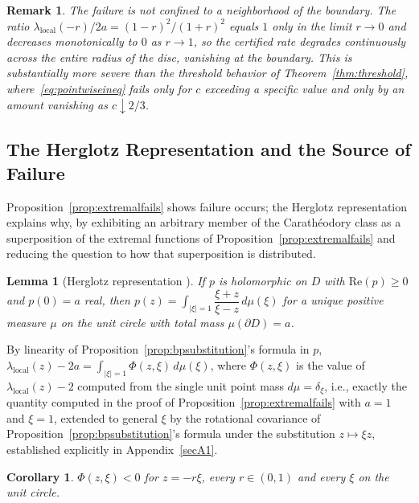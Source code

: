 \documentclass[pdflatex,sn-mathphys-num]{sn-jnl}%
\theoremstyle{thmstyleone}%
\theoremstyle{thmstyletwo}%
\newtheorem{remark}{Remark}%
\theoremstyle{thmstylethree}%
\newtheorem{lemma}{Lemma} %
\newtheorem{corollary}{Corollary}
\begin{document}
\begin{remark}
\label{rem:severityoffail}
The failure is not confined to a neighborhood of the boundary. The ratio $\lambda_{\mathrm{local}}(-r)/2a=(1-r)^2/(1+r)^2$ equals $1$ only in the limit $r\to0$ and decreases monotonically to $0$ as $r\to1$, so the certified rate degrades continuously across the entire radius of the disc, vanishing at the boundary. This is substantially more severe than the threshold behavior of Theorem~\ref{thm:threshold}, where~\eqref{eq:pointwiseineq} fails only for $c$ exceeding a specific value and only by an amount vanishing as $c\downarrow2/3$.
\end{remark}

\subsection{The Herglotz Representation and the Source of Failure}

Proposition~\ref{prop:extremalfails} shows failure occurs; the Herglotz representation explains why, by exhibiting an arbitrary member of the Carath\'eodory class as a superposition of the extremal functions of Proposition~\ref{prop:extremalfails} and reducing the question to how that superposition is distributed.

\begin{lemma}[Herglotz representation \cite{garnett2007bounded}]
\label{lem:herglotz}
If $p$ is holomorphic on $D$ with $\mathrm{Re}(p)\ge0$ and $p(0)=a$ real, then $p(z)=\int_{|\xi|=1}\dfrac{\xi+z}{\xi-z}\,d\mu(\xi)$ for a unique positive measure $\mu$ on the unit circle with total mass $\mu(\partial D)=a$.
\end{lemma}

By linearity of Proposition~\ref{prop:bpsubstitution}'s formula in $p$, $\lambda_{\mathrm{local}}(z)-2a=\int_{|\xi|=1}\Phi(z,\xi)\,d\mu(\xi)$, where $\Phi(z,\xi)$ is the value of $\lambda_{\mathrm{local}}(z)-2$ computed from the single unit point mass $d\mu=\delta_\xi$, i.e., exactly the quantity computed in the proof of Proposition~\ref{prop:extremalfails} with $a=1$ and $\xi=1$, extended to general $\xi$ by the rotational covariance of Proposition~\ref{prop:bpsubstitution}'s formula under the substitution $z\mapsto\xi z$, established explicitly in Appendix~\ref{secA1}.

\begin{corollary}
\label{cor:kernelnegative}
$\Phi(z,\xi)<0$ for $z=-r\xi$, every $r\in(0,1)$ and every $\xi$ on the unit circle.
\end{corollary}
\end{document}
